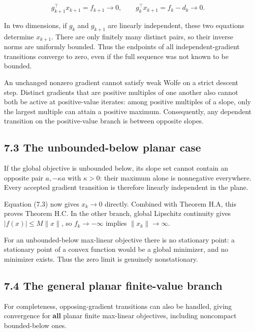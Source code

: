 \[
g_{k+1}^\top x_{k+1}=f_{k+1}\longrightarrow0,
\qquad
g_k^\top x_{k+1}=f_k-d_k\longrightarrow0.
\tag{H.7.3}
\]

In two dimensions, if \(g_k\) and \(g_{k+1}\) are linearly independent,
these two equations determine \(x_{k+1}\). There are only finitely many
distinct pairs, so their inverse norms are uniformly bounded. Thus the
endpoints of all independent-gradient transitions converge to zero, even
if the full sequence was not known to be bounded.

An unchanged nonzero gradient cannot satisfy weak Wolfe on a strict
descent step. Distinct gradients that are positive multiples of one
another also cannot both be active at positive-value iterates: among
positive multiples of a slope, only the largest multiple can attain a
positive maximum. Consequently, any dependent transition on the
positive-value branch is between opposite slopes.

\subsection{7.3 The unbounded-below planar
case}\label{H:the-unbounded-below-planar-case}

If the global objective is unbounded below, its slope set cannot contain
an opposite pair \(a,-\kappa a\) with \(\kappa>0\): their maximum alone
is nonnegative everywhere. Every accepted gradient transition is
therefore linearly independent in the plane.

Equation (7.3) now gives \(x_k\to0\) directly. Combined with Theorem H.A,
this proves Theorem H.C. In the other branch, global Lipschitz continuity
gives \(|f(x)|\le M\|x\|\), so \(f_k\to-\infty\) implies
\(\|x_k\|\to\infty\).

For an unbounded-below max-linear objective there is no stationary
point: a stationary point of a convex function would be a global
minimizer, and no minimizer exists. Thus the zero limit is genuinely
nonstationary.

\subsection{7.4 The general planar finite-value
branch}\label{H:the-general-planar-finite-value-branch}

For completeness, opposing-gradient transitions can also be handled,
giving convergence for \textbf{all} planar finite max-linear objectives,
including noncompact bounded-below ones.

